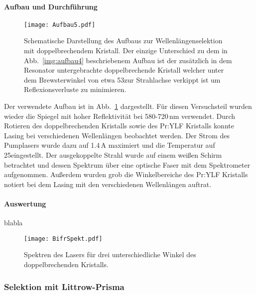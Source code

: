 \paragraph{Aufbau und Durchführung}


\begin{figure}[H]
\begin{center}
  \texttt{[image: Aufbau5.pdf]}
  \caption{Schematische Darstellung des Aufbaus zur Wellenlängenselektion mit doppelbrechendem Kristall. Der einzige Unterschied zu dem in Abb.~\ref{img:aufbau4} beschriebenem Aufbau ist der zusätzlich in dem Resonator untergebrachte doppelbrechende Kristall welcher unter dem Brewsterwinkel von etwa 53\grad zur Strahlachse verkippt ist um Reflexionsverluste zu minimieren.}
  \label{img:aufbau5}
\end{center}
\end{figure}

Der verwendete Aufbau ist in Abb.~\ref{img:aufbau5} dargestellt. Für diesen Versuchsteil wurden wieder die Spiegel mit hoher Reflektivität bei 580-720\,nm verwendet.
Durch Rotieren des doppelbrechenden Kristalls sowie des Pr:YLF Kristalls konnte Lasing bei verschiedenen Wellenlängen beobachtet werden. Der Strom des Pumplasers wurde dazu auf 1.4\,A maximiert und die Temperatur auf 25\grad eingestellt. Der ausgekoppelte Strahl wurde auf einem weißen Schirm betrachtet und dessen Spektrum über eine optische Faser mit dem Spektrometer aufgenommen. Außerdem wurden grob die Winkelbereiche des Pr:YLF Kristalls notiert bei dem Lasing mit den verschiedenen Wellenlängen auftrat.




\paragraph{Auswertung}
blabla

\begin{figure}[H]
\begin{center}
  \texttt{[image: BifrSpekt.pdf]}
  \caption{Spektren des Lasers für drei unterschiedliche Winkel des doppelbrechenden Kristalls.}
  \label{img:BifrSpekt}
\end{center}
\end{figure}

\subsubsection{Selektion mit Littrow-Prisma}

